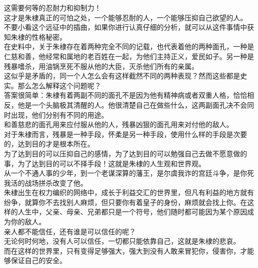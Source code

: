 \begin{multicols}{\theparacolNo}
这需要何等的忍耐力和抑制力！\\

这才是朱棣真正的可怕之处，一个能够忍耐的人，一个能够压抑自己欲望的人。\\

不要小看这个远征中的插曲，如果你进行认真仔细的分析，就可以从这件事情中获知朱棣的性格秘密。\\

在史料中，关于朱棣存在着两种完全不同的记载，也代表着他的两种面孔，一种是仁慈和善，他经常和属地的老百姓在一起，为他们主持正义，爱民如子。另一种是残暴嗜杀，用油锅烹死不服从他的大臣，灭杀他们所有的亲属。\\

这似乎是矛盾的，同一个人怎么会有这样截然不同的两种表现？然而这些都是史实。那么怎么解释这个问题呢？\\

答案很简单：朱棣有着两副不同的面孔不是因为他有精神病或者双重人格，恰恰相反，他是一个头脑极其清醒的人。他很清楚自己在做些什么，这两副面孔决不会同时出现，他们分别有不同的用途。\\

和善慈悲的面孔用来应付服从他的人，残暴凶狠的面孔用来对付他的敌人。\\

对于朱棣而言，残暴是一种手段，怀柔是另一种手段，使用什么样的手段是次要的，达到目的才是根本所在。\\

为了达到目的可以压抑自己的感情，为了达到目的可以勉强自己去做不愿意做的事，为了达到目的可以不择手段！这就是朱棣的人生观和世界观。\\

从一个不通人事的少年，到一个老谋深算的藩王，是尔虞我诈的宫廷斗争，是你死我活的战场拼杀改变了他。\\

朱棣出生在权力编织的网络中，成长于利益交汇的世界里，但凡有利益的地方就有纷争，就算你不去找别人麻烦，但只要你有着皇子的身份，麻烦就会找上你。在这样的人生中，父亲、母亲、兄弟都只是一个符号，他们随时都可能因为某个原因成为你的敌人。\\

亲人都不能信任，还有谁是可以信任的呢？\\

无论何时何地，没有人可以信任，一切都只能依靠自己，这就是朱棣的悲哀。\\

而在这样的世界里，只有变得足够强大，强大到没有人敢来冒犯你，侵害你，才能够保证自己的安全。\\


\end{multicols}
